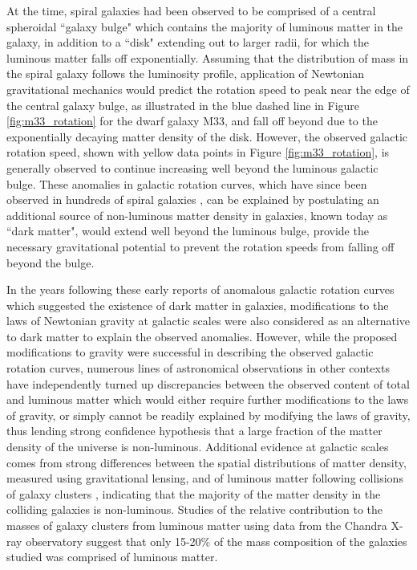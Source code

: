 At the time, spiral galaxies had been observed to be comprised of a central spheroidal ``galaxy bulge" which contains the majority of luminous matter in the galaxy, in addition to a ``disk" extending out to larger radii, for which the luminous matter falls off exponentially. Assuming that the distribution of mass in the spiral galaxy follows the luminosity profile, application of Newtonian gravitational mechanics would predict the rotation speed to peak near the edge of the central galaxy bulge, as illustrated in the blue dashed line in Figure \ref{fig:m33_rotation} for the dwarf galaxy M33, and fall off beyond due to the exponentially decaying matter density of the disk. However, the observed galactic rotation speed, shown with yellow data points in Figure \ref{fig:m33_rotation}, is generally observed to continue increasing well beyond the luminous galactic bulge. These anomalies in galactic rotation curves, which have since been observed in hundreds of spiral galaxies \cite{rotn_curves_1995}, can be explained by postulating an additional source of non-luminous matter density in galaxies, known today as ``dark matter", would extend well beyond the luminous bulge, provide the necessary gravitational potential to prevent the rotation speeds from falling off beyond the bulge.

In the years following these early reports of anomalous galactic rotation curves which suggested the existence of dark matter in galaxies, modifications to the laws of Newtonian gravity at galactic scales \cite{mond_1983} were also considered as an alternative to dark matter to explain the observed anomalies. However, while the proposed modifications to gravity were successful in describing the observed galactic rotation curves, numerous lines of astronomical observations in other contexts have independently turned up discrepancies between the observed content of total and luminous matter which would either require further modifications to the laws of gravity, or simply cannot be readily explained by modifying the laws of gravity, thus lending strong confidence hypothesis that a large fraction of the matter density of the universe is non-luminous. Additional evidence at galactic scales comes from strong differences between the spatial distributions of matter density, measured using gravitational lensing, and of luminous matter following collisions of galaxy clusters \cite{bullet_1995}, indicating that the majority of the matter density in the colliding galaxies is non-luminous. Studies of the relative contribution to the masses of galaxy clusters from luminous matter using data from the Chandra X-ray observatory \cite{Chandra_2013} suggest that only 15-20\% of the mass composition of the galaxies studied was comprised of luminous matter.

